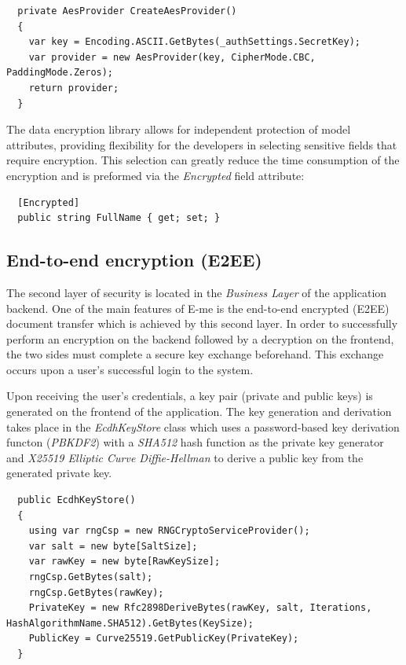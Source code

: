 \begin{lstlisting}
  private AesProvider CreateAesProvider()
  {
	var key = Encoding.ASCII.GetBytes(_authSettings.SecretKey);
	var provider = new AesProvider(key, CipherMode.CBC,	 PaddingMode.Zeros);
	return provider;
  }
\end{lstlisting}

The data encryption library allows for independent protection of model attributes, providing flexibility for the developers in selecting sensitive fields
that require encryption. This selection can greatly reduce the time consumption of the encryption and is preformed via the \emph{Encrypted} field attribute:

\begin{lstlisting}
  [Encrypted]
  public string FullName { get; set; }
\end{lstlisting}

\subsection{End-to-end encryption (E2EE)}

The second layer of security is located in the \emph{Business Layer} of the application backend.
One of the main features of E-me is the end-to-end encrypted (E2EE) document transfer which is achieved by this second layer.
In order to successfully perform an encryption on the backend followed by a decryption on the frontend, the two sides must complete a secure key exchange beforehand.
This exchange occurs upon a user's successful login to the system.

Upon receiving the user's credentials, a key pair (private and public keys) is generated on the frontend of the application.
The key generation and derivation takes place in the \emph{EcdhKeyStore} class which uses a password-based key derivation functon (\emph{PBKDF2}) with a \emph{SHA512} hash function
as the private key generator and \emph{X25519 Elliptic Curve Diffie-Hellman} to derive a public key from the generated private key.

\begin{lstlisting}
  public EcdhKeyStore()
  {
	using var rngCsp = new RNGCryptoServiceProvider();
	var salt = new byte[SaltSize];
	var rawKey = new byte[RawKeySize];
	rngCsp.GetBytes(salt);
	rngCsp.GetBytes(rawKey);
	PrivateKey = new Rfc2898DeriveBytes(rawKey, salt, Iterations, HashAlgorithmName.SHA512).GetBytes(KeySize);
	PublicKey = Curve25519.GetPublicKey(PrivateKey);  
  }
\end{lstlisting}

